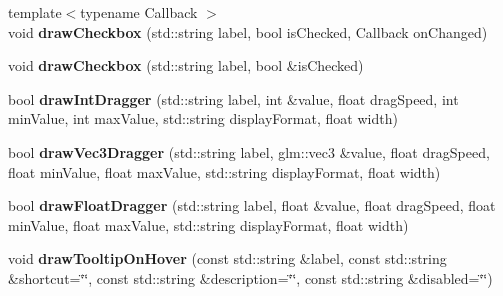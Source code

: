 \begin{DoxyCompactItemize}
\item 
\mbox{\label{classpepr3d_1_1_side_pane_aa585367929e09354f49e0740571f475b}} 
{\footnotesize template$<$typename Callback $>$ }\\void {\bfseries draw\+Checkbox} (std\+::string label, bool is\+Checked, Callback on\+Changed)
\item 
\mbox{\label{classpepr3d_1_1_side_pane_a65b9063ac82c6249eef2c1a7586a0cfb}} 
void {\bfseries draw\+Checkbox} (std\+::string label, bool \&is\+Checked)
\item 
\mbox{\label{classpepr3d_1_1_side_pane_ae31dbf3dc9f11c3a4a2721c59ca043df}} 
bool {\bfseries draw\+Int\+Dragger} (std\+::string label, int \&value, float drag\+Speed, int min\+Value, int max\+Value, std\+::string display\+Format, float width)
\item 
\mbox{\label{classpepr3d_1_1_side_pane_a284ec9b8a323a0b4bf01fddb8551d4b2}} 
bool {\bfseries draw\+Vec3\+Dragger} (std\+::string label, glm\+::vec3 \&value, float drag\+Speed, float min\+Value, float max\+Value, std\+::string display\+Format, float width)
\item 
\mbox{\label{classpepr3d_1_1_side_pane_a67b9ac3cbdcbae622df47cf7fa7fe0d0}} 
bool {\bfseries draw\+Float\+Dragger} (std\+::string label, float \&value, float drag\+Speed, float min\+Value, float max\+Value, std\+::string display\+Format, float width)
\item 
\mbox{\label{classpepr3d_1_1_side_pane_ad2aec2dd5fb2b89689af2478547c58c5}} 
void {\bfseries draw\+Tooltip\+On\+Hover} (const std\+::string \&label, const std\+::string \&shortcut=\char`\"{}\char`\"{}, const std\+::string \&description=\char`\"{}\char`\"{}, const std\+::string \&disabled=\char`\"{}\char`\"{})
\end{DoxyCompactItemize}
